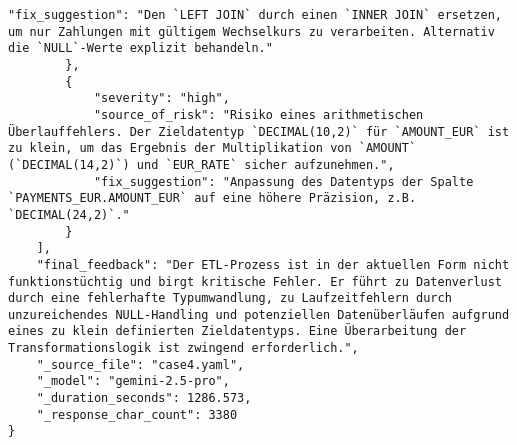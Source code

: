 \begin{lstlisting}[caption={Ausgabe: GEMINI 2.5 Pro Anwendungsfall 4 Hauptdurchlauf},label={gemini_case4_prompt1}]
            "fix_suggestion": "Den `LEFT JOIN` durch einen `INNER JOIN` ersetzen, um nur Zahlungen mit gültigem Wechselkurs zu verarbeiten. Alternativ die `NULL`-Werte explizit behandeln."
        },
        {
            "severity": "high",
            "source_of_risk": "Risiko eines arithmetischen Überlauffehlers. Der Zieldatentyp `DECIMAL(10,2)` für `AMOUNT_EUR` ist zu klein, um das Ergebnis der Multiplikation von `AMOUNT` (`DECIMAL(14,2)`) und `EUR_RATE` sicher aufzunehmen.",
            "fix_suggestion": "Anpassung des Datentyps der Spalte `PAYMENTS_EUR.AMOUNT_EUR` auf eine höhere Präzision, z.B. `DECIMAL(24,2)`."
        }
    ],
    "final_feedback": "Der ETL-Prozess ist in der aktuellen Form nicht funktionstüchtig und birgt kritische Fehler. Er führt zu Datenverlust durch eine fehlerhafte Typumwandlung, zu Laufzeitfehlern durch unzureichendes NULL-Handling und potenziellen Datenüberläufen aufgrund eines zu klein definierten Zieldatentyps. Eine Überarbeitung der Transformationslogik ist zwingend erforderlich.",
    "_source_file": "case4.yaml",
    "_model": "gemini-2.5-pro",
    "_duration_seconds": 1286.573,
    "_response_char_count": 3380
}
\end{lstlisting}

